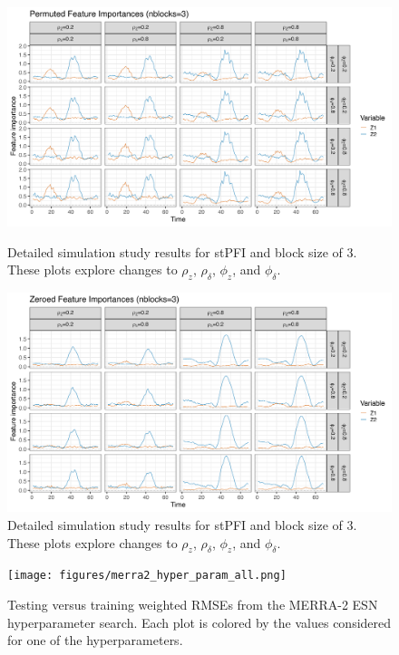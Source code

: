 \documentclass[AMS,STIX2COL]{WileyNJD-v2}
\begin{document}
\begin{figure}[h]
    \centering
    \includegraphics[width=\textwidth]{figures/simulation_pfi_rho_phi.png}
    \caption{Detailed simulation study results for stPFI and block size of 3. These plots explore changes to $\rho_z$, $\rho_{\delta}$, $\phi_z$, and $\phi_{\delta}$.}
    \label{fig:pfi-supplement-rhophi}
    \vspace{1cm}
    \includegraphics[width=\textwidth]{figures/simulation_zfi_rho_phi.png}
    \caption{Detailed simulation study results for stPFI and block size of 3. These plots explore changes to $\rho_z$, $\rho_{\delta}$, $\phi_z$, and $\phi_{\delta}$.}
    \label{fig:zfi-supplement-rhophi}
\end{figure}

\begin{figure}[h]
    \centering
    \texttt{[image: figures/merra2\_hyper\_param\_all.png]}
    \caption{Testing versus training weighted RMSEs from the MERRA-2 ESN hyperparameter search. Each plot is colored by the values considered for one of the hyperparameters.}
    \label{fig:hp_all}
\end{figure}
\end{document}

